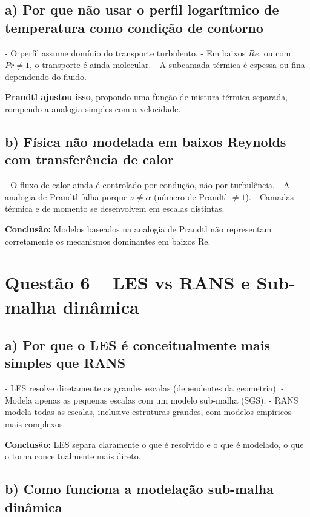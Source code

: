 \documentclass[a4paper,12pt]{article}
\begin{document}
\subsection*{a) Por que não usar o perfil logarítmico de temperatura como condição de contorno}

- O perfil assume domínio do transporte turbulento.
- Em baixos \( Re \), ou com \( Pr \ne 1 \), o transporte é ainda molecular.
- A subcamada térmica é espessa ou fina dependendo do fluido.

\textbf{Prandtl ajustou isso}, propondo uma função de mistura térmica separada, rompendo a analogia simples com a velocidade.

\subsection*{b) Física não modelada em baixos Reynolds com transferência de calor}

- O fluxo de calor ainda é controlado por condução, não por turbulência.
- A analogia de Prandtl falha porque \( \nu \ne \alpha \) (número de Prandtl \( \ne 1 \)).
- Camadas térmica e de momento se desenvolvem em escalas distintas.

\textbf{Conclusão:} Modelos baseados na analogia de Prandtl não representam corretamente os mecanismos dominantes em baixos Re.

\section*{Questão 6 – LES vs RANS e Sub-malha dinâmica}

\subsection*{a) Por que o LES é conceitualmente mais simples que RANS}

- LES resolve diretamente as grandes escalas (dependentes da geometria).
- Modela apenas as pequenas escalas com um modelo sub-malha (SGS).
- RANS modela todas as escalas, inclusive estruturas grandes, com modelos empíricos mais complexos.

\textbf{Conclusão:} LES separa claramente o que é resolvido e o que é modelado, o que o torna conceitualmente mais direto.

\subsection*{b) Como funciona a modelação sub-malha dinâmica}
\end{document}
